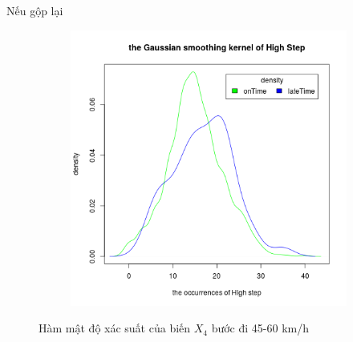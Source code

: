 \documentclass[a4paper, 13pt]{report}
\begin{document}
\FloatBarrier
Nếu gộp lại \\
\FloatBarrier
\begin{figure}[h]
    \begin{subfigure}[b]{0.7\textwidth}
        \includegraphics[width=\textwidth]{DensityHighStep.png}
    \end{subfigure}
\caption*{Hàm mật độ xác suất của biến $X_4$ bước đi 45-60 km/h}
\end{figure}
\FloatBarrier
\FloatBarrier
\end{document}
